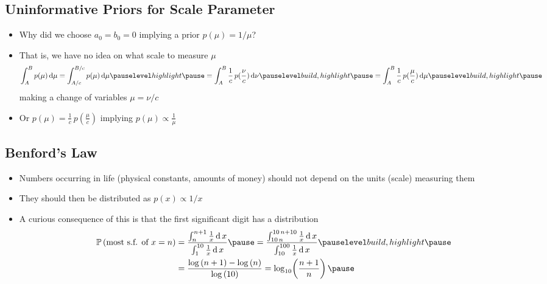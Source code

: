 \begin{slide}
\section[-3]{Uninformative Priors for Scale Parameter}

\pb
\begin{itemize}\pause{}
\item Why did we choose $a_0=b_0=0$ implying a prior
  $p(\mu)=1/\mu$?\pauseh{}
  \begin{center}
    \pause
  \end{center}
\item That is, we have no idea on what scale to measure $\mu$
  \begin{align*}
    \int_A^B p(\mu) \, \dd \mu = \int_{A/c}^{B/c} p(\mu) \, \dd \mu\pauseh
    = \int_A^B \frac{1}{c} \, p(\frac{\nu}{c}) \,\dd \nu\pauseb
    = \int_A^B \frac{1}{c} \, p(\frac{\mu}{c}) \,\dd \mu\pauseb
  \end{align*}
  making a change of variables $\mu=\nu/c$\pauseb
\item Or $ p(\mu)= \frac{1}{c}\, p(\frac{\mu}{c})$ implying
  $p(\mu)\propto \frac{1}{\mu}$\pauseh
\end{itemize}

\end{slide}


\begin{slide}
\section{Benford's Law}

\begin{PauseHighLight}
  \begin{itemize}
  \item Numbers occurring in life (physical constants, amounts of money)
    should not depend on the units (scale) measuring them\pause
  \item They should then be distributed as $p(x) \propto 1/x$\pause
  \item A curious consequence of this is that the first significant
    digit has a distribution
    \begin{align*}
      \Prob{\mbox{most s.f. of $x=n$}} &= \frac{ \int_n^{n+1} \frac{1}{x} \,
        \dd \, x}{\int_1^{10} \frac{1}{x} \,
        \dd \, x}\pause = \frac{ \int_{10\,n}^{10\,n+10} \frac{1}{x} \,
        \dd \, x}{\int_{10}^{100} \frac{1}{x} \,
        \dd \, x}\pauseb
      \\
      &=  \frac{\logg{n+1}-\logg{n}}{\logg{10}} =
      \log_{10}\!\left(\frac{n+1}{n}\right)\pause
    \end{align*}
  \end{itemize}
\end{PauseHighLight}

\end{slide}

